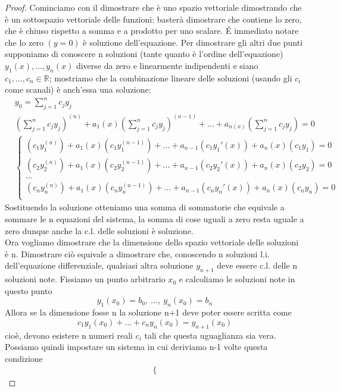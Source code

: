 \documentclass[10pt,a4paper]{article}
\newtheorem{proof}{Proof}
\begin{document}
\begin{proof}
	Cominciamo con il dimostrare che è uno spazio vettoriale dimostrando che è un sottospazio vettoriale delle funzioni: basterà dimostrare che contiene lo zero, che è chiuso rispetto a somma e a prodotto per uno scalare. \'{E} immediato notare che lo zero \((y = 0)\) è soluzione dell'equazione. Per dimostrare gli altri due punti supponiamo di conoscere n soluzioni (tante quanto è l'ordine dell'equazione) \({y_1(x), ... , y_n(x)}\) diverse da zero e linearmente indipendenti e siano \({c_1, ... , c_n} \in \mathbb{R} \); mostriamo che la combinazione lineare delle soluzioni (usando gli \(c_i\) come scanali) è anch'essa una soluzione:
	\begin{align*}
		&y_0 = \sum_{j=1}^{n}c_j y_j\\
		&(\sum_{j=1}^{n}c_j y_j)^{(n)}+ a_1(x)(\sum_{j=1}^{n}c_j y_j)^{(n-1)}+...+a_{n(x)}( \sum_{j=1}^{n}c_j y_j)=0\\
		&\begin{cases}
			(c_1 y_1^{(n)}) + a_1(x)(c_1y_1^{(n-1)}) +...+  a_{n-1}(c_1 y_1'(x)) + a_n(x)(c_1y_1) = 0\\
			(c_2 y_2^{(n)}) + a_1(x)(c_2y_2^{(n-1)}) +...+  a_{n-1}(c_2 y_2'(x)) + a_n(x)(c_2y_2) = 0\\
			...\\
			(c_n y_n^{(n)}) + a_1(x)(c_ny_n^{(n-1)}) +...+  a_{n-1}(c_n y_n'(x)) + a_n(x)(c_ny_n) = 0\\
		\end{cases}
	\end{align*}
	Sostituendo la soluzione otteniamo una somma di sommatorie che equivale a sommare le n equazioni del sistema, la somma di cose uguali a zero resta uguale a zero dunque anche la c.l. delle soluzioni è soluzione.\\
	Ora vogliamo dimostrare che la dimensione dello spazio vettoriale delle soluzioni è n. Dimostrare ciò equivale a dimostrare che, conoscendo n soluzioni l.i. dell'equazione differenziale, qualsiasi altra soluzione \(y_{n+1}\) deve essere c.l. delle n soluzioni note. Fissiamo un punto arbitrario \(x_0\) e calcoliamo le soluzioni note in questo punto
	\[y_1(x_0)=b_0,\ ...,\ y_n(x_0)=b_n\]
	Allora se la dimensione fosse n la soluzione n+1 deve poter essere scritta come
	\[ c_1 y_1(x_0)+ ...+ c_n y_n(x_0) = y_{n+1}(x_0) \]
	cioè, devono esistere n numeri reali \(c_i\) tali che questa uguaglianza sia vera. Possiamo quindi impostare un sistema in cui deriviamo n-1 volte questa condizione
	\begin{align*}
		&\begin{cases}

\end{cases}
\end{align*}
\end{proof}
\end{document}
